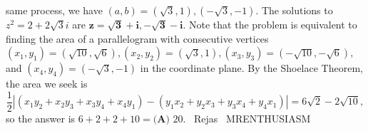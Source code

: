 \documentclass[12pt]{article}
\begin{document}
same process, we have $(a,b)=\left(\sqrt3,1\right),\left(-\sqrt3,-1\right).$ The solutions to $z^2=2+2\sqrt{3}i$ are $\boldsymbol{z=\sqrt3+i,-\sqrt3-i}.$ Note that the problem is equivalent to finding the area of a parallelogram with consecutive vertices $(x_1,y_1)=\left(\sqrt{10}, \sqrt{6}\right),(x_2,y_2)=\left(\sqrt{3},1\right),(x_3,y_3)=\left(-\sqrt{10},-\sqrt{6}\right),$ and $(x_4,y_4)=\left(-\sqrt{3}, -1\right)$ in the coordinate plane. By the Shoelace Theorem, the area we seek is \[\frac{1}{2} \left|(x_1y_2 + x_2y_3 + x_3y_4 + x_4y_1) - (y_1x_2 + y_2x_3 + y_3x_4 + y_4x_1)\right| = 6\sqrt2-2\sqrt{10},\] so the answer is $6+2+2+10=\boxed{\textbf{(A) } 20}.$ ~Rejas ~MRENTHUSIASM
\end{document}
